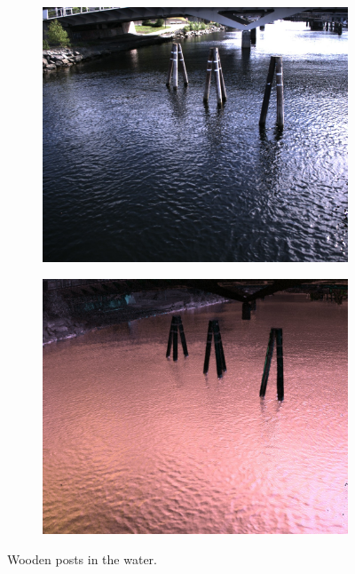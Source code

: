 \begin{figure}[H]
    \begin{subfigure}[T]{.49\textwidth}
        \includegraphics[width=\textwidth]{figures/pictures/img_7458_s0.jpg}
    \end{subfigure} \hfill
    \begin{subfigure}[T]{.49\textwidth}
        \includegraphics[width=\textwidth]{figures/pictures/img_7458_pol.jpg}
        
    \end{subfigure}
    \caption{Wooden posts in the water.}
\end{figure}
\vspace{-.5cm}


